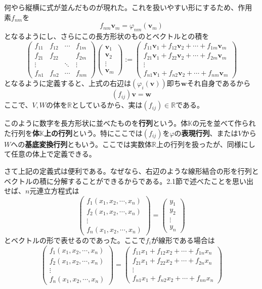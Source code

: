 \documentclass[dvipdfmx]{jsarticle}
\begin{document}
何やら縦横に式が並んだものが現れた。これを扱いやすい形にするため、作用素$f_{nm}$を
\[f_{nm}\bm{v}_m=\varphi_{nm}(\bm{v}_m)\]
となるようにし、さらにこの長方形状のものとベクトルとの積を
\[\begin{pmatrix}f_{11}&f_{12}&\cdots&f_{1m}\\f_{21}&f_{22}&{}&f_{2m}\\\vdots&{}&\ddots&\vdots\\f_{n1}&f_{n2}&\cdots&f_{nm}\end{pmatrix}\begin{pmatrix}\bm{v}_1\\\bm{v}_2\\\vdots\\\bm{v}_m\end{pmatrix}:=\begin{pmatrix}f_{11}\bm{v}_1+f_{12}\bm{v}_2+\cdots+f_{1m}\bm{v}_m\\f_{21}\bm{v}_1+f_{22}\bm{v}_2+\cdots+f_{2m}\bm{v}_m\\\vdots\\f_{n1}\bm{v}_1+f_{n2}\bm{v}_2+\cdots+f_{nm}\bm{v}_m\end{pmatrix}\]
となるように定義すると、上式の右辺は$(\varphi_i(\bm{v}))$即ち$\bm{w}$それ自身であるから
\[(f_{ij})\bm{v}=\bm{w}\]
ここで、$V,W$の体を$\mathbb{R}$としているから、実は$(f_{ij})\in\mathbb{R}$である。\par
このように数字を長方形状に並べたものを\textbf{行列}という。体$\mathbb{K}$の元を並べて作られた行列を\textbf{体}$\mathbb{K}$\textbf{上の行列}という。特にここでは$(f_{ij})$を$\varphi$の\textbf{表現行列}、または$V$から$W$への\textbf{基底変換行列}ともいう。ここでは実数体$\mathbb{R}$上の行列を扱ったが、同様にして任意の体上で定義できる。\par
さて上記の定義式は便利である。なぜなら、右辺のような線形結合の形を行列とベクトルの積に分解することができるからである。2.1節で述べたことを思い出せば、$n$元連立方程式は
\[\begin{pmatrix}f_1(x_1,x_2,\cdots,x_n)\\f_2(x_1,x_2,\cdots,x_n)\\\vdots\\f_n(x_1,x_2,\cdots,x_n)\end{pmatrix}=\begin{pmatrix}y_1\\y_2\\\vdots\\y_n\end{pmatrix}\]
とベクトルの形で表せるのであった。ここで$f_i$が線形である場合は
\[\begin{pmatrix}f_1(x_1,x_2,\cdots,x_n)\\f_2(x_1,x_2,\cdots,x_n)\\\vdots\\f_n(x_1,x_2,\cdots,x_n)\end{pmatrix}=\begin{pmatrix}f_{11}x_1+f_{12}x_2+\cdots+f_{1n}x_n\\f_{21}x_1+f_{22}x_2+\cdots+f_{2n}x_n\\\vdots\\f_{n1}x_1+f_{n2}x_2+\cdots+f_{nn}x_n\end{pmatrix}\]
\end{document}
